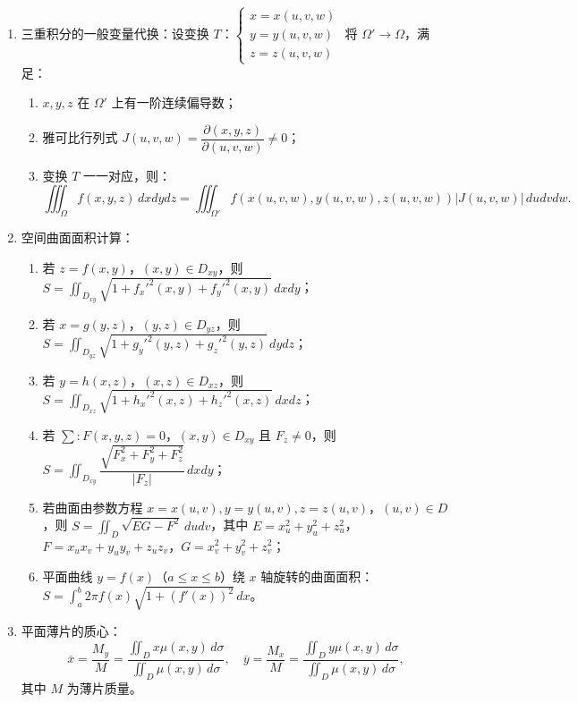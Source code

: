 \documentclass[UTF8]{ctexart}
\theoremstyle{remark}
\begin{document}
\begin{enumerate}
		\item 三重积分的一般变量代换：设变换 \(T\)：\(\begin{cases} x = x(u, v, w) \\ y = y(u, v, w) \\ z = z(u, v, w) \end{cases}\) 将 \(\Omega' \to \Omega\)，满足：
		\begin{enumerate}
			\item \(x, y, z\) 在 \(\Omega'\) 上有一阶连续偏导数；
			\item 雅可比行列式 \(J(u, v, w) = \dfrac{\partial(x, y, z)}{\partial(u, v, w)} \neq 0\)；
			\item 变换 \(T\) 一一对应，则：
			\[
			\iiint_{\Omega} f(x, y, z) \, dxdydz = \iiint_{\Omega'} f(x(u, v, w), y(u, v, w), z(u, v, w)) |J(u, v, w)| \, dudvdw.
			\]
		\end{enumerate}
		
		\item 空间曲面面积计算：
		\begin{enumerate}
			\item 若 \(z = f(x, y)\)，\((x, y) \in D_{xy}\)，则 \(S = \iint_{D_{xy}} \sqrt{1 + f_x'^2(x, y) + f_y'^2(x, y)} \, dxdy\)；
			\item 若 \(x = g(y, z)\)，\((y, z) \in D_{yz}\)，则 \(S = \iint_{D_{yz}} \sqrt{1 + g_y'^2(y, z) + g_z'^2(y, z)} \, dydz\)；
			\item 若 \(y = h(x, z)\)，\((x, z) \in D_{xz}\)，则 \(S = \iint_{D_{xz}} \sqrt{1 + h_x'^2(x, z) + h_z'^2(x, z)} \, dxdz\)；
			\item 若 \(\sum: F(x, y, z) = 0\)，\((x, y) \in D_{xy}\) 且 \(F_z \neq 0\)，则 \(S = \iint_{D_{xy}} \dfrac{\sqrt{F_x^2 + F_y^2 + F_z^2}}{|F_z|} \, dxdy\)；
			\item 若曲面由参数方程 \(x = x(u, v), y = y(u, v), z = z(u, v)\)，\((u, v) \in D\)，则 \(S = \iint_D \sqrt{EG - F^2} \, dudv\)，其中 \(E = x_u^2 + y_u^2 + z_u^2\)，\(F = x_u x_v + y_u y_v + z_u z_v\)，\(G = x_v^2 + y_v^2 + z_v^2\)；
			\item 平面曲线 \(y = f(x)\)（\(a \leq x \leq b\)）绕 \(x\) 轴旋转的曲面面积：\(S = \int_a^b 2\pi f(x) \sqrt{1 + (f'(x))^2} \, dx\)。
		\end{enumerate}
		
		\item 平面薄片的质心：
		\[
		\overline{x} = \frac{M_y}{M} = \frac{\iint_D x \mu(x, y) \, d\sigma}{\iint_D \mu(x, y) \, d\sigma}, \quad \overline{y} = \frac{M_x}{M} = \frac{\iint_D y \mu(x, y) \, d\sigma}{\iint_D \mu(x, y) \, d\sigma},
		\]
		其中 \(M\) 为薄片质量。
		

\end{enumerate}
\end{document}
